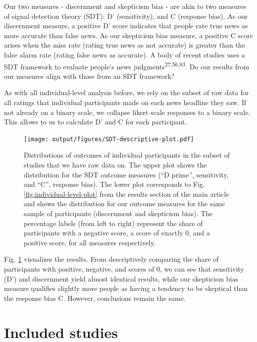 \documentclass[
  doc,floatsintext]{apa6}
\begin{document}
Our two measures - discernment and skepticism bias - are akin to two measures of signal detection theory (SDT): D' (sensitivity), and C (response bias). As our discernment measure, a positive D' score indicates that people rate true news as more accurate than false news. As our skepticism bias measure, a positive C score arises when the miss rate (rating true news as not accurate) is greater than the false alarm rate (rating false news as accurate). A body of recent studies uses a SDT framework to evaluate people's news judgments\textsuperscript{27,56,83}. Do our results from our measures align with those from an SDT framework?

As with all individual-level analysis before, we rely on the subset of raw data for all ratings that individual participants made on each news headline they saw. If not already on a binary scale, we collapse likert scale responses to a binary scale. This allows to us to calculate D' and C for each participant.



\begin{figure}
\centering
\texttt{[image: output/figures/SDT-descriptive-plot.pdf]}
\caption{\label{fig:SDT-descriptive-plot}Distributions of outcomes of individual participants in the subset of studies that we have raw data on. The upper plot shows the distribution for the SDT outcome measures (``D prime'', sensitivity, and ``C'', response bias). The lower plot corresponds to Fig. \ref{fig:individual-level-plot} from the results section of the main article and shows the distribution for our outcome measures for the same sample of participants (discernment and skepticism bias). The percentage labels (from left to right) represent the share of participants with a negative score, a score of exactly 0, and a positive score, for all measures respectively.}
\end{figure}

Fig. \ref{fig:SDT-descriptive-plot} visualizes the results. From descriptively comparing the share of participants with positive, negative, and scores of 0, we can see that sensitivity (D') and discernment yield almost identical results, while our skepticism bias measure qualifies slightly more people as having a tendency to be skeptical than the response bias C. However, conclusions remain the same.

\clearpage

\section{Included studies}\label{included-studies}
\end{document}
